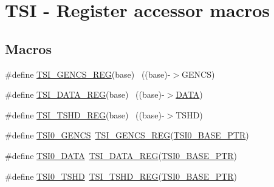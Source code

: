 \hypertarget{group___t_s_i___register___accessor___macros}{}\section{T\+SI -\/ Register accessor macros}
\label{group___t_s_i___register___accessor___macros}
\subsection*{Macros}
\begin{DoxyCompactItemize}
\item 
\#define \hyperlink{group___t_s_i___register___accessor___macros_gacb2292491464fa55b36996380b09077f}{T\+S\+I\+\_\+\+G\+E\+N\+C\+S\+\_\+\+R\+EG}(base)                                        ~((base)-\/$>$G\+E\+N\+CS)
\item 
\#define \hyperlink{group___t_s_i___register___accessor___macros_gab8a711133e324dcb170ee244de065488}{T\+S\+I\+\_\+\+D\+A\+T\+A\+\_\+\+R\+EG}(base)                                          ~((base)-\/$>$\hyperlink{_pantalla_dvr_8h_aad9ae913bdfab20dd94ad04ee2d5b045}{D\+A\+TA})
\item 
\#define \hyperlink{group___t_s_i___register___accessor___macros_ga4ecfdd78411a0b04595c47c3fc3393ec}{T\+S\+I\+\_\+\+T\+S\+H\+D\+\_\+\+R\+EG}(base)                                          ~((base)-\/$>$T\+S\+HD)
\item 
\#define \hyperlink{group___t_s_i___register___accessor___macros_gabe033284ba64fa3097ff12d10c0b5e85}{T\+S\+I0\+\_\+\+G\+E\+N\+CS}~\hyperlink{group___t_s_i___register___accessor___macros_gacb2292491464fa55b36996380b09077f}{T\+S\+I\+\_\+\+G\+E\+N\+C\+S\+\_\+\+R\+EG}(\hyperlink{group___t_s_i___peripheral_gaf98ea1cd15559446e0cfc1ae177751f6}{T\+S\+I0\+\_\+\+B\+A\+S\+E\+\_\+\+P\+TR})
\item 
\#define \hyperlink{group___t_s_i___register___accessor___macros_gac08465d7c2f98c2c372c26e622a05126}{T\+S\+I0\+\_\+\+D\+A\+TA}~\hyperlink{group___t_s_i___register___accessor___macros_gab8a711133e324dcb170ee244de065488}{T\+S\+I\+\_\+\+D\+A\+T\+A\+\_\+\+R\+EG}(\hyperlink{group___t_s_i___peripheral_gaf98ea1cd15559446e0cfc1ae177751f6}{T\+S\+I0\+\_\+\+B\+A\+S\+E\+\_\+\+P\+TR})
\item 
\#define \hyperlink{group___t_s_i___register___accessor___macros_ga8a7a92091c84eb3bddf218fa540d611f}{T\+S\+I0\+\_\+\+T\+S\+HD}~\hyperlink{group___t_s_i___register___accessor___macros_ga4ecfdd78411a0b04595c47c3fc3393ec}{T\+S\+I\+\_\+\+T\+S\+H\+D\+\_\+\+R\+EG}(\hyperlink{group___t_s_i___peripheral_gaf98ea1cd15559446e0cfc1ae177751f6}{T\+S\+I0\+\_\+\+B\+A\+S\+E\+\_\+\+P\+TR})
\end{DoxyCompactItemize}


